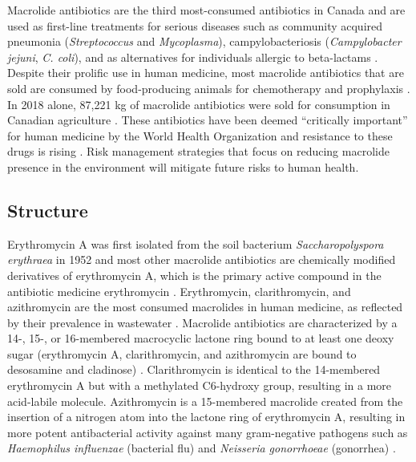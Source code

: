 Macrolide antibiotics are the third most-consumed antibiotics in Canada and are used as first-line treatments for serious diseases such as community acquired pneumonia (\textit{Streptococcus} and \textit{Mycoplasma}), campylobacteriosis (\textit{Campylobacter jejuni}, \textit{C. coli}), and as alternatives for individuals allergic to beta-lactams \parencite{PublicHealthAgencyofCanada.2020, CapeloMartinez.2019}.
Despite their prolific use in human medicine, most macrolide antibiotics that are sold are consumed by food-producing animals for chemotherapy and prophylaxis \parencite{CapeloMartinez.2019}.
In 2018 alone, 87,221 kg of macrolide antibiotics were sold for consumption in Canadian agriculture \parencite{PublicHealthAgencyofCanada.2020}.
These antibiotics have been deemed “critically important” for human medicine by the World Health Organization and resistance to these drugs is rising \parencite{Resistance.2017, PublicHealthAgencyofCanada.2020}.
Risk management strategies that focus on reducing macrolide presence in the environment will mitigate future risks to human health.

\subsection{Structure}

Erythromycin A was first isolated from the soil bacterium \textit{Saccharopolyspora erythraea} in 1952 and most other macrolide antibiotics are chemically modified derivatives of erythromycin A, which is the primary active compound in the antibiotic medicine erythromycin \parencite{Haight.1952}.
Erythromycin, clarithromycin, and azithromycin are the most consumed macrolides in human medicine, as reflected by their prevalence in wastewater \parencite{Miao.2004, RodriguezMozaz.2020}.
Macrolide antibiotics are characterized by a 14-, 15-, or 16-membered macrocyclic lactone ring bound to at least one deoxy sugar (erythromycin A, clarithromycin, and azithromycin are bound to desosamine and cladinose) \parencite{CapeloMartinez.2019} \dummyfig.
Clarithromycin is identical to the 14-membered erythromycin A but with a methylated C6-hydroxy group, resulting in a more acid-labile molecule.
Azithromycin is a 15-membered macrolide created from the insertion of a nitrogen atom into the lactone ring of erythromycin A, resulting in more potent antibacterial activity against many gram-negative pathogens such as \textit{Haemophilus influenzae} (bacterial flu) and \textit{Neisseria gonorrhoeae} (gonorrhea) \parencite{Yanagihara.2009}.


